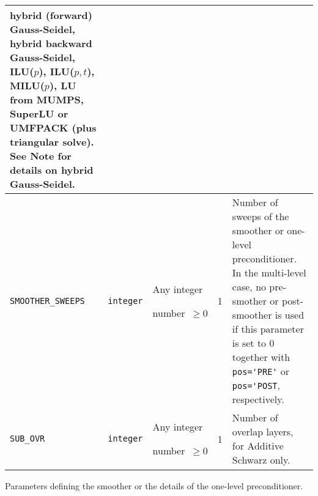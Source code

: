 \begin{center}
\begin{tabular}{|p{3.6cm}|l|p{1.9cm}|p{3.6cm}|p{6.5cm}|}
                            hybrid (forward) Gauss-Seidel, hybrid backward
                           Gauss-Seidel, ILU($p$),  ILU($p,t$), MILU($p$),
                           LU from MUMPS, SuperLU or UMFPACK
                           (plus triangular solve). See Note for details on hybrid
                           Gauss-Seidel. \\ \hline
\verb|SMOOTHER_SWEEPS|  & \verb|integer|
                         & Any integer \par number~$\ge 0$
                         & 1
                         & Number of sweeps of the smoother or one-level preconditioner.
                            In the multi-level case, no pre-smother or
                            post-smoother is used if this parameter is set to 0 
                            together with \verb|pos='PRE'| or \verb|pos='POST|,
                           respectively. \\ \hline
\verb|SUB_OVR|  & \verb|integer|
                         & Any integer \par number~$\ge 0$
                         & 1
                         & Number of overlap layers, for Additive Schwarz only. \\
\hline
\end{tabular}
\end{center}
\caption{Parameters defining the smoother or the details of the one-level preconditioner.
\label{tab:p_smoother}}  
\esideways

